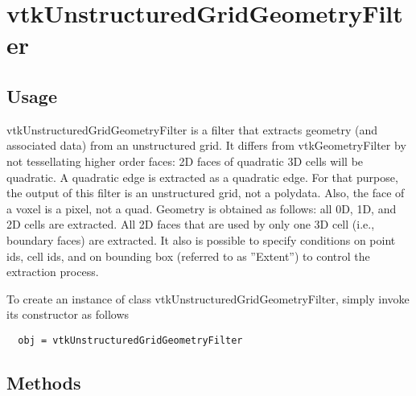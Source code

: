 \section{vtkUnstructuredGridGeometryFilter}

\subsection{Usage}

 vtkUnstructuredGridGeometryFilter is a filter that extracts
 geometry (and associated data) from an unstructured grid. It differs from
 vtkGeometryFilter by not tessellating higher order faces: 2D faces of
 quadratic 3D cells will be quadratic. A quadratic edge is extracted as a
 quadratic edge. For that purpose, the output of this filter is an
 unstructured grid, not a polydata.
 Also, the face of a voxel is a pixel, not a quad.
 Geometry is obtained as follows: all 0D, 1D, and 2D cells are extracted.
 All 2D faces that are used by only one 3D cell (i.e., boundary faces) are
 extracted. It also is possible to specify conditions on point ids, cell ids,
 and on bounding box (referred to as ''Extent'') to control the extraction
 process.


To create an instance of class vtkUnstructuredGridGeometryFilter, simply
invoke its constructor as follows
\begin{verbatim}
  obj = vtkUnstructuredGridGeometryFilter
\end{verbatim}
\subsection{Methods}

